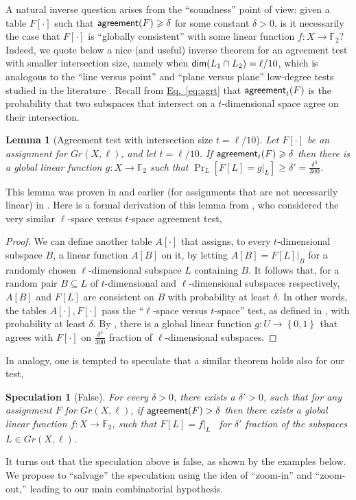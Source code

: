 \documentclass[11pt]{article}
\numberwithin{equation}{section}
\newtheorem{lemma}[theorem]{Lemma}
\theoremstyle{definition}
\theoremstyle{plain}
\newcommand{\expeqref}[2]{\hyperref[#2]{#1~\eqref{#2}}}
\newtheorem{spec}[theorem]{Speculation}
\newcommand\set[1]{{\left\{ #1 \right\}}}
\newcommand\Prob[2]{{\Pr_{#1}\left[ {#2} \right]}}
\newcommand\power[1]{\set{0,1}^{#1}}
\newcommand*\dimm{{\sf dim}}
\renewcommand\ge{\geqslant}
\def\F{\mathbb{F}}
\def\agr{{\sf agreement}}
\begin{document}
A natural inverse question arises from the ``soundness'' point of view:
given a table $F[\cdot]$ such that $\agr(F)\ge\delta$ for some
constant $\delta > 0$, is it necessarily the case that $F[\cdot]$ is
``globally consistent'' with some linear function $f:X \to\F_2$?
Indeed, we quote below a nice (and useful)  inverse theorem for an agreement test
with smaller intersection size, namely when
$\dimm(L_1\cap L_2)=\ell/10$, which is analogous to the ``line versus
point'' and ``plane versus plane'' %
low-degree  %
tests studied in the
literature %
\cite{RS96,AS03,RaSa}.  %
Recall from \expeqref{Eq.}{eq:agrt} that
$\agr_t(F)$ is the probability that two subspaces that intersect on a
$t$-dimensional space agree on their intersection.
\begin{lemma}[Agreement test with intersection size $t=\ell/10$] \label{lemma:lin-aux-1} Let $F[\cdot]$ be an assignment for $Gr(X,\ell)$, and let $t=\ell/10$. If $\agr_{t}(F)\ge \delta$ then there is a global linear function $g:X \to \F_2$ such that $\Prob{L}{F[L] = g|_L}\ge \delta'=\frac{\delta^3}{300}$.
\end{lemma}
This lemma was proven in  \cite[Theorem D.1]{KMS} and earlier (for assignments that are not necessarily linear) in \cite{IKW}. Here is a formal derivation of this lemma from \cite{KMS}, who considered the very similar $\ell$-space versus $t$-space agreement test,
\begin{proof}
We can define another table $A[\cdot]$ that assigns, to every $t$-dimensional subspace $B$,
a linear function $A[B]$ on it, by letting $A[B] = F[L]|_B$ for a randomly chosen $\ell$-dimensional subspace $L$ containing $B$. It follows that, for a random pair $B \subseteq L$ of $t$-dimensional and $\ell$-dimensional subspaces respectively,  $A[B]$ and $F[L]$ are consistent on $B$ with probability
at least %
 $\delta.$ In other words, the tables $A[\cdot], F[\cdot]$ pass the ``$\ell$-space versus $t$-space'' test, as defined in \cite[Section D]{KMS},
with probability at least
%
$\delta.$
By \cite[Theorem D.1]{KMS}, there is a global linear function $g:U \to \power{}$ that agrees with $F[\cdot]$ on
$\frac{\delta^3}{300}$
%
fraction of $\ell$-dimensional subspaces.
\end{proof}
%
In analogy, one is tempted to speculate that a similar theorem holds also for our test,
%
\begin{spec}[False]\label{spec:1}
For every %
$\delta>0$, there exists a
%
$\delta'>0$, such that
for any assignment $F$ for $Gr(X,\ell)$, if $\agr(F)>\delta$ then
there exists a global linear function $f\colon X \to\F_2$,
such that $F[L] = f|_L$ ~for $\delta'$
fraction of the subspaces $L\in Gr(X,\ell)$.
\end{spec}
%
It turns out that the speculation above is false, as shown by the examples below.
%
We propose to ``salvage''
the speculation using the idea of ``zoom-in'' and ``zoom-out,'' leading to our main combinatorial hypothesis.
\end{document}
